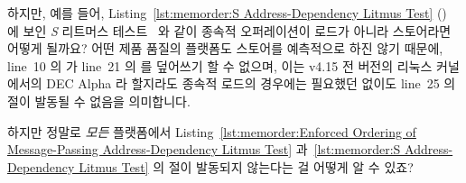 하지만, 예를 들어,
Listing~\ref{lst:memorder:S Address-Dependency Litmus Test}
() 에 보인 \emph{S} 리트머스
테스트~\cite{JadeAlglave2011ppcmem} 와 같이 종속적 오퍼레이션이 로드가 아니라
스토어라면 어떻게 될까요?
어떤 제품 품질의 플랫폼도 스토어를 예측적으로 하진 않기 때문에, line~10 의
 가 line~21 의  를 덮어쓰기 할 수 없으며,
이는 v4.15 전 버전의 리눅스 커널에서의 DEC Alpha 라 할지라도 종속적 로드의
경우에는 필요했던  없이도 line~25 의 
절이 발동될 수 없음을 의미합니다.

\QuickQuiz{}
	하지만 정말로 \emph{모든} 플랫폼에서
	Listing~\ref{lst:memorder:Enforced Ordering of Message-Passing Address-Dependency Litmus Test}
	과~\ref{lst:memorder:S Address-Dependency Litmus Test} 의 
	절이 발동되지 않는다는 걸 어떻게 알 수 있죠?
	\iffalse


